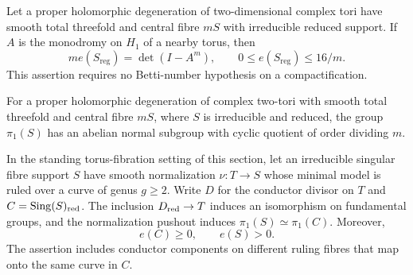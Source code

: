 
\begin{proposition}[P4.13]\hypertarget{tag-02WK}{}\label{night:P4.13}\label{stmt:P4.13}


Let a proper holomorphic degeneration of two-dimensional complex
tori have smooth total threefold and central fibre $mS$ with
irreducible reduced support. If $A$ is the monodromy on $H_1$ of
a nearby torus, then
\[
 m e(S_{\mathrm{reg}})=\det(I-A^m),\qquad
 0\le e(S_{\mathrm{reg}})\le16/m.
\]
This assertion requires no Betti-number hypothesis on a compactification.
\end{proposition}

\begin{proposition}[P4R.1]\hypertarget{tag-02Y2}{}\label{night:P4R.1}\label{stmt:P4R.1}


For a proper holomorphic degeneration of complex two-tori with
smooth total threefold and central fibre $mS$, where $S$ is
irreducible and reduced, the group $\pi_1(S)$ has an abelian
normal subgroup with cyclic quotient of order dividing $m$.
\end{proposition}

\begin{proposition}[P4R.3]\hypertarget{tag-02YF}{}\label{night:P4R.3}\label{stmt:P4R.3}


In the standing torus-fibration setting of this section, let an irreducible singular fibre
support $S$ have smooth normalization $\nu:T\to S$ whose
minimal model is ruled over a curve of genus $g\ge2$.
Write $D$ for the conductor divisor on $T$ and
$C=\operatorname{Sing}(S)_{\rm red}$.
The inclusion $D_{\rm red}\to T$ induces an isomorphism on
fundamental groups, and the normalization pushout induces
$\pi_1(S)\simeq\pi_1(C)$. Moreover,
\[
 e(C)\ge0,\qquad e(S)>0.
\]
The assertion includes conductor components on different
ruling fibres that map onto the same curve in $C$.
\end{proposition}

